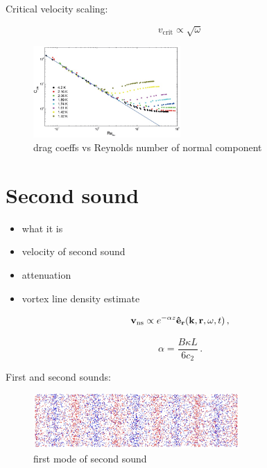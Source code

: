 Critical velocity scaling:

\begin{equation}
v_{\text{crit}} \propto \sqrt{\omega}
\end{equation}

\begin{figure}[h]
	\centering
	\includegraphics[width=0.5\textwidth]{graphics/theory/C-Re_normal}
	\caption{drag coeffs vs Reynolds number of normal component}
	\label{C-Re_normal}
\end{figure}

\section{Second sound}
\begin{itemize}
	\item what it is
	\item velocity of second sound
	\item attenuation
	\item vortex line density estimate
\end{itemize}

\begin{equation}
\mathbf{v}_{\mathrm{ns}} \propto e^{-\alpha z} \mathbf{\hat{e}}_{\mathbf{r}}(\mathbf{k},\mathbf{r},\omega,t)\,,
\end{equation}

\begin{equation}
\alpha = \frac{B\kappa L}{6 c_2}
\label{alpha_mean}\,.
\end{equation}


First and second sounds:

\begin{figure}[h]
	\centering
	\includegraphics[width=0.7\textwidth]{graphics/theory/ss_1}
	\caption{first mode of second sound}
	\label{ss_1}
\end{figure}

